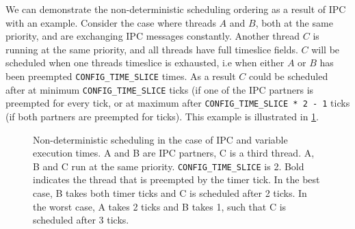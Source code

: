 We can demonstrate the non-deterministic scheduling ordering as a result of IPC with an example.
Consider the case where threads $A$ and $B$, both at the same priority, and are exchanging IPC messages constantly.
Another thread $C$ is running at the same priority, and all threads have full timeslice fields.
$C$ will be scheduled when one threads timeslice is exhausted, i.e when either $A$ or $B$ has been preempted \texttt{CONFIG\_TIME\_SLICE} times.
As a result $C$ could be scheduled after at minimum \texttt{CONFIG\_TIME\_SLICE} ticks (if one of the \gls{IPC} partners is preempted for every tick, or at maximum after \texttt{CONFIG\_TIME\_SLICE * 2 - 1} ticks (if both partners are preempted for ticks).
This example is illustrated in \cref{fig:non-determinism}.

\begin{figure}
    \centering
    \caption{Non-deterministic scheduling in the case of IPC and variable execution times. A and B are IPC partners, C is a third thread. A, B and C run at the same priority. \texttt{CONFIG\_TIME\_SLICE} is 2. Bold indicates the thread that is preempted by the timer tick. In the best case, B takes both timer ticks and C is scheduled after 2 ticks. In the worst case, A takes 2 ticks and B takes 1, such that C is scheduled after 3 ticks.}
    \label{fig:non-determinism}
\end{figure}

